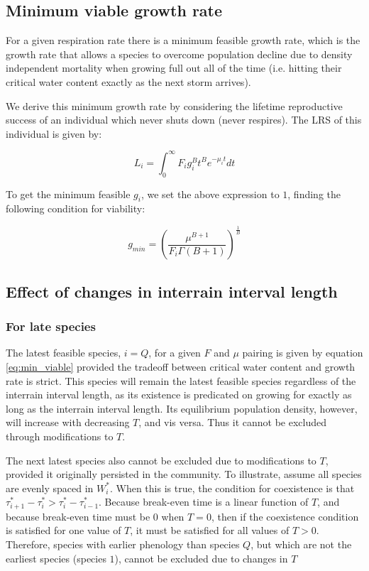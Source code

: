 \documentclass[11pt]{article}
\begin{document}
\subsection{Minimum viable growth rate}
\label{sec:org81fa6bf}

For a given respiration rate there is a minimum feasible growth rate, which is the growth rate that allows a species to overcome population decline due to density independent mortality when growing full out all of the time (i.e. hitting their critical water content exactly as the next storm arrives).

We derive this minimum growth rate by considering the lifetime reproductive success of an individual which never shuts down (never respires). The LRS of this individual is given by:

\begin{equation}
    L_i = \int_0^\infty F_i g_i^B t^B e^{-\mu_i t} dt
\end{equation}

To get the minimum feasible \(g_i\), we set the above expression to \(1\), finding the following condition for viability:

\begin{equation} \label{eq:min_viable}
    g_{min} = \left(\frac{\mu^{B+1}}{F_i \Gamma(B+1)}\right)^{\frac{1}{B}}
\end{equation}

\subsection{Effect of changes in interrain interval length}
\label{sec:org6afe4d2}

\subsubsection{For late species}
\label{sec:org02dd6cd}

The latest feasible species, \(i=Q\), for a given \(F\) and \(\mu\) pairing is given by equation \ref{eq:min_viable} provided the tradeoff between critical water content and growth rate is strict. This species will remain the latest feasible species regardless of the interrain interval length, as its existence is predicated on growing for exactly as long as the interrain interval length. Its equilibrium population density, however, will increase with decreasing \(T\), and vis versa. Thus it cannot be excluded through modifications to \(T\).

The next latest species also cannot be excluded due to modifications to \(T\), provided it originally persisted in the community. To illustrate, assume all species are evenly spaced in \(W_i^*\). When this is true, the condition for coexistence is that \(\tau_{i+1}^* - \tau_{i}^* > \tau_i^* - \tau_{i-1}^*\). Because break-even time is a linear function of \(T\), and because break-even time must be \(0\) when \(T = 0\), then if the coexistence condition is satisfied for one value of \(T\), it must be satisfied for all values of \(T > 0\). Therefore, species with earlier phenology than species \(Q\), but which are not the earliest species (species \(1\)), cannot be excluded due to changes in \(T\)
\end{document}
